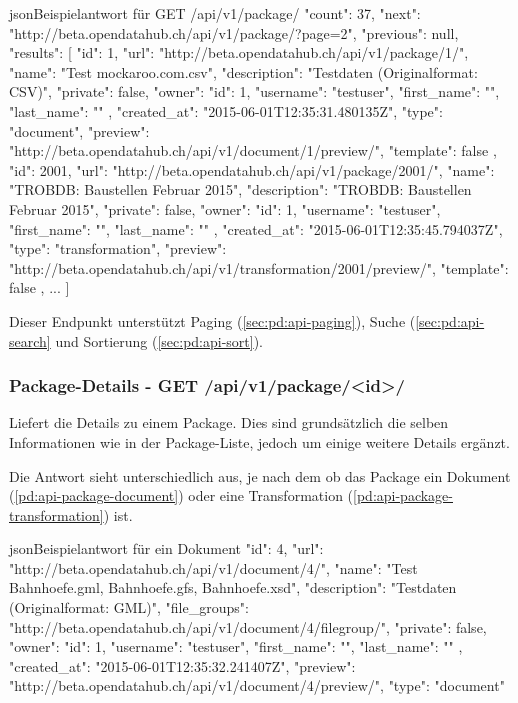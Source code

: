 \begin{srclst}{json}{Beispielantwort für GET /api/v1/package/}
{
    "count": 37, 
    "next": "http://beta.opendatahub.ch/api/v1/package/?page=2", 
    "previous": null, 
    "results": [
        {
            "id": 1, 
            "url": "http://beta.opendatahub.ch/api/v1/package/1/", 
            "name": "Test mockaroo.com.csv", 
            "description": "Testdaten (Originalformat: CSV)", 
            "private": false, 
            "owner": {
                "id": 1, 
                "username": "testuser", 
                "first_name": "", 
                "last_name": ""
            }, 
            "created_at": "2015-06-01T12:35:31.480135Z", 
            "type": "document", 
            "preview": "http://beta.opendatahub.ch/api/v1/document/1/preview/", 
            "template": false
        }, 
        {
            "id": 2001, 
            "url": "http://beta.opendatahub.ch/api/v1/package/2001/", 
            "name": "TROBDB: Baustellen Februar 2015", 
            "description": "TROBDB: Baustellen Februar 2015", 
            "private": false, 
            "owner": {
                "id": 1, 
                "username": "testuser", 
                "first_name": "", 
                "last_name": ""
            }, 
            "created_at": "2015-06-01T12:35:45.794037Z", 
            "type": "transformation", 
            "preview": "http://beta.opendatahub.ch/api/v1/transformation/2001/preview/", 
            "template": false
        },
        ...
    ]
}
\end{srclst}

Dieser Endpunkt unterstützt Paging (\cref{sec:pd:api-paging}), Suche (\cref{sec:pd:api-search} und Sortierung (\cref{sec:pd:api-sort}).

\subsubsection{Package-Details - GET /api/v1/package/<id>/}\label{sec:pd:api-package-details}
Liefert die Details zu einem Package. Dies sind grundsätzlich die selben Informationen wie in der Package-Liste, jedoch um einige weitere Details ergänzt.

Die Antwort sieht unterschiedlich aus, je nach dem ob das Package ein Dokument (\cref{pd:api-package-document}) oder eine Transformation (\cref{pd:api-package-transformation}) ist.

\begin{srclst}[label=pd:api-package-document]{json}{Beispielantwort für ein Dokument}
{
    "id": 4, 
    "url": "http://beta.opendatahub.ch/api/v1/document/4/", 
    "name": "Test Bahnhoefe.gml, Bahnhoefe.gfs, Bahnhoefe.xsd", 
    "description": "Testdaten (Originalformat: GML)", 
    "file_groups": "http://beta.opendatahub.ch/api/v1/document/4/filegroup/", 
    "private": false, 
    "owner": {
        "id": 1, 
        "username": "testuser", 
        "first_name": "", 
        "last_name": ""
    }, 
    "created_at": "2015-06-01T12:35:32.241407Z", 
    "preview": "http://beta.opendatahub.ch/api/v1/document/4/preview/", 
    "type": "document"
}
\end{srclst}

